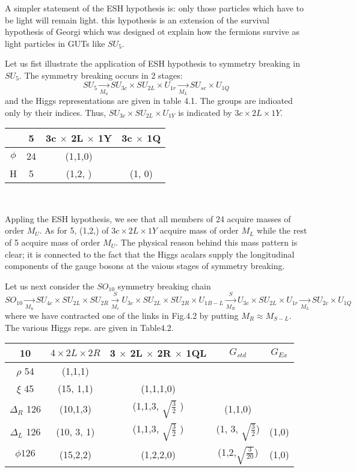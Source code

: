 A simpler statement of the ESH hypothesis is: only those particles which have to be light will remain light. this hypothesis is an extension of the survival hypothesis of Georgi which was designed ot explain how the fermions survive as light particles in GUTs like $SU_{5}$.

Let us fist illustrate the application of ESH hypothesis to symmetry breaking in $SU_{5}$. The symmetry breaking occurs in 2 stages:
$$
SU_{5} \xrightarrow[M_{u}]{} SU_{3c} \times SU_{2L} \times U_{1r} \xrightarrow[M_{L}]{} SU_{sc} \times U_{1Q}
$$
and the Higgs representations are given in table 4.1. The groups are indioated only by their indices. Thus, $SU_{3c} \times SU_{2L} \times U_{1Y}$ is indicated by $3c \times 2L \times 1Y$.
\begin{center}
\begin{tabular}{|c|c|c|c|}
\hline
 & 5 & 3c $\times$ 2L $\times$ 1Y & 3c $\times$ 1Q\\
 \hline
 $\phi$ & 24 & (1,1,0) &  \\
 H  & 5  & (1,2, ) & (1, 0)\\
 \hline
\end{tabular}\\[.2cm]
\end{center}

Appling the ESH hypothesis, we see that all members of 24 acquire masses of order $M_{U}$. As for 5, (1,2,) of $3c \times 2L \times 1Y$ acquire mass of order $M_{L}$ while the rest of 5 acquire mass of order $M_{U}$. The physical reason behind this mass pattern is clear; it is connected to the fact that the Higgs acalars supply the longitudinal components of the gauge bosons at the vaious stages of symmetry breaking.

Let us next consider the $SO_{10}$ symmetry breaking chain $SO_{10}\xrightarrow[M_{u}]{} SU_{4c} \times SU_{2L} \times SU_{2R} \xrightarrow[M_{c}]SU_{3c} \times SU_{2L} \times SU_{2R} \times U_{1B-L}\xrightarrow[M_{R}] SU_{3c} \times SU_{2L} \times U_{1r} \xrightarrow[M_{L}]{} SU_{2c} \times U_{1Q}$
where we have contracted one of the links in Fig.4.2 by putting $M_{R}\approx M_{S-L}$. The various Higgs reps. are given in Table4.2.
\begin{center}
\begin{tabular}{|c|c|c|c|c|}
\hline
10 & $4 \times 2L \times 2R$ & 3 $\times$ 2L $\times$ 2R $\times$ 1QL & $G_{std}$ & $G_{Ex}$\\
\hline
$\rho$ 54 & (1,1,1) &  & & \\
$\xi$ 45 & (15, 1,1) & (1,1,1,0) & &\\
$\Delta_{R}$ 126 & (10,1,3) & (1,1,3, $\sqrt{\frac{3}{2}}$ )& (1,1,0) & \\
$\Delta_{L}$ 126 & (10, 3, 1) & (1,1,3, $\sqrt{\frac{3}{2}}$ ) & (1, 3, $\sqrt{\frac{3}{2}}$) & (1,0)\\
$\phi 126$ & (15,2,2) & (1,2,2,0)&(1,2,$\sqrt{\frac{3}{20}}$) & (1,0)\\
\hline
\end{tabular}\\[.2cm]
\end{center}

